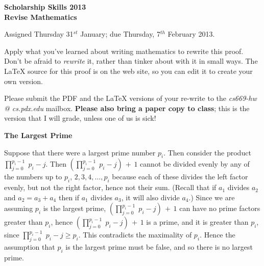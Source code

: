 \documentclass[12pt]{article}
\begin{document}
\begin{center}
\large
\bf
Scholarship Skills 2013\\[1ex]  %

\Large
Revise Mathematics
\normalsize

\vspace{1ex}
Assigned Thursday 31$^{st}$ January; due Thursday, 7$^{th}$ February 2013.
\\[2pc]  %
\end{center}


\noindent
Apply what you've learned about writing mathematics to rewrite this proof.  
Don't be afraid to \emph{rewrite} it, rather than tinker about with it in small ways.
The \LaTeX{} source for this proof is on the web site, so you can edit it to create your own version.

Please submit the PDF and the \LaTeX{} versions of your re-write to the \textit{cs669-hw @ cs.pdx.edu} mailbox.  \textbf{Please also bring a paper copy to class}; this is the version that I will grade, unless one of us is sick!

\vspace{15pt}    %

\begin{center}
\large
\textbf{The Largest Prime}
\end{center}
\normalsize
\noindent
Suppose that there were a largest prime number $p_i$. 
Then consider the product $\prod_{j=0}^{p_i-1} \; p_i-j$. 
Then $\left( \prod_{j=0}^{p_i-1} \; p_i - j \right) \,+\,1$ 
cannot be divided evenly by any of the numbers
up to $p_i$, $2,3,4,\ldots,p_i$ because each of these divides the left
factor evenly, but not the right factor, hence not their sum.
(Recall that if $a_1$ divides $a_2$ and $a_2=a_3+a_4$ then if $a_1$
divides $a_3$, it will also divide $a_4$.)  
Since we are assuming
$p_i$ is the largest prime, $\left(\prod_{j=0}^{p_i-1}
\;p_i-j\right)\,+\,1$ can have no prime factors greater than $p_i$,
hence $\left(\prod_{j=0}^{p_i-1} \;p_i-j\right)\,+\,1$ is a prime, and
it is greater than $p_i$, since $\prod_{j=0}^{p_i-1}\;p_i-j \ge p_i$.
This contradicts the maximality of $p_i$.  
Hence the assumption that
$p_i$ is the largest prime must be false, and so there is no largest
prime.
\end{document}
